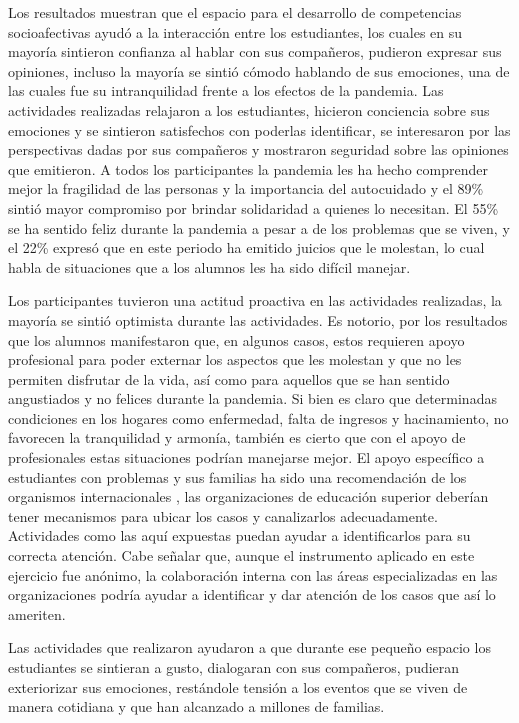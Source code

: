 \documentclass[spanish]{textolivre}
\begin{document}
Los resultados muestran que el espacio para el desarrollo de competencias socioafectivas ayudó a la interacción entre los estudiantes, los cuales en su mayoría sintieron confianza al hablar con sus compañeros, pudieron expresar sus opiniones, incluso la mayoría se sintió cómodo hablando de sus emociones, una de las cuales fue su intranquilidad frente a los efectos de la pandemia. Las actividades realizadas relajaron a los estudiantes, hicieron conciencia sobre sus emociones y se sintieron satisfechos con poderlas identificar, se interesaron por las perspectivas dadas por sus compañeros y mostraron seguridad sobre las opiniones que emitieron. A todos los participantes la pandemia les ha hecho comprender mejor la fragilidad de las personas y la importancia del autocuidado y el 89\% sintió mayor compromiso por brindar solidaridad a quienes lo necesitan. El 55\% se ha sentido feliz durante la pandemia a pesar a de los problemas que se viven, y el 22\% expresó que en este periodo ha emitido juicios que le molestan, lo cual habla de situaciones que a los alumnos les ha sido difícil manejar. 

Los participantes tuvieron una actitud proactiva en las actividades realizadas, la mayoría se sintió optimista durante las actividades. Es notorio, por los resultados que los alumnos manifestaron que, en algunos casos, estos requieren apoyo profesional para poder externar los aspectos que les molestan y que no les permiten disfrutar de la vida, así como para aquellos que se han sentido angustiados y no felices durante la pandemia. Si bien es claro que determinadas condiciones en los hogares como enfermedad, falta de ingresos y hacinamiento, no favorecen la tranquilidad y armonía, también es cierto que con el apoyo de profesionales estas situaciones podrían manejarse mejor. El apoyo específico a estudiantes con problemas y sus familias ha sido una recomendación de los organismos internacionales \cite{lopez2021}, las organizaciones de educación superior deberían tener mecanismos para ubicar los casos y canalizarlos adecuadamente. Actividades como las aquí expuestas puedan ayudar a identificarlos para su correcta atención. Cabe señalar que, aunque el instrumento aplicado en este ejercicio fue anónimo, la colaboración interna con las áreas especializadas en las organizaciones podría ayudar a identificar y dar atención de los casos que así lo ameriten.

Las actividades que realizaron ayudaron a que durante ese pequeño espacio los estudiantes se sintieran a gusto, dialogaran con sus compañeros, pudieran exteriorizar sus emociones, restándole tensión a los eventos que se viven de manera cotidiana y que han alcanzado a millones de familias.
\end{document}
